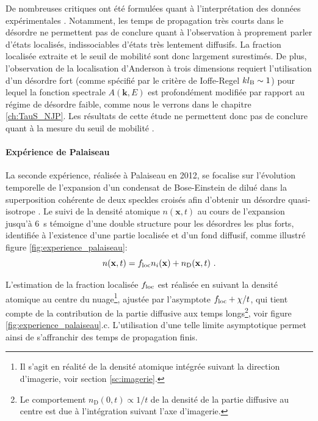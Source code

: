 De nombreuses critiques ont été formulées quant à l'interprétation des données expérimentales \citep{muller2014comment}. Notamment, les temps de propagation très courts dans le désordre ne permettent pas de conclure quant à l'observation à proprement parler d'états localisés, indissociables d'états très lentement diffusifs. La fraction localisée extraite et le seuil de mobilité sont donc largement surestimés. De plus, l'observation de la localisation d'Anderson à trois dimensions requiert l'utilisation d'un désordre fort (comme spécifié par le critère de Ioffe-Regel $kl_{\mathrm{B}}\sim 1$) pour lequel la fonction spectrale $A(\mathbf{k},E)$ est profondément modifiée par rapport au régime de désordre faible, comme nous le verrons dans le chapitre \ref{ch:TauS_NJP}. Les résultats de cette étude ne permettent donc pas de conclure quant à la mesure du seuil de mobilité \citep{pasek2017anderson}.



\paragraph*{Expérience de Palaiseau}
La seconde expérience, réalisée à Palaiseau en 2012, se focalise sur l'évolution temporelle de l'expansion d'un condensat de Bose-Einstein de  dilué dans la superposition cohérente de deux speckles croisés afin d'obtenir un désordre quasi-isotrope \citep{jendrzejewski2012three}. Le suivi de la densité atomique $n(\mathbf{x},t)$ au cours de l'expansion jusqu'à \SI{6}{\second} témoigne d'une double structure pour les désordres les plus forts, identifiée à l'existence d'une partie localisée et d'un fond diffusif, comme illustré figure \ref{fig:experience_palaiseau}:
\begin{equation}
n(\mathbf{x},t)= f_{\mathrm{loc}} n_i(\mathbf{x}) + n_{\mathrm{D}}(\mathbf{x},t) \text{ .}
\end{equation}

L'estimation de la fraction localisée $f_{\mathrm{loc}}$ est réalisée en suivant la densité atomique au centre du nuage\footnote{Il s'agit en réalité de la densité atomique intégrée suivant la direction d'imagerie, voir section \ref{sc:imagerie}.}, ajustée par l'asymptote $f_{\mathrm{loc}}+\chi/t$, qui tient compte de la contribution de la partie diffusive aux temps longs\footnote{Le comportement $n_{\mathrm{D}}(0,t)\propto 1/t$ de la densité de la partie diffusive au centre est due à l'intégration suivant l'axe d'imagerie.}, voir figure \ref{fig:experience_palaiseau}.c. L'utilisation d'une telle limite asymptotique permet ainsi de s'affranchir des temps de propagation finis.


